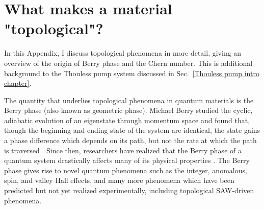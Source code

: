 \documentclass[double,12pt,1in,seploa]{beavtex}
\let\Oldsection\section
\renewcommand{\section}{\FloatBarrier\Oldsection}
\begin{document}








\chapter{What makes a material "topological"?} \label{appendix on topology}

In this Appendix, I discuss topological phenomena in more detail, giving an overview of the origin of Berry phase and the Chern number. This is additional background to the Thouless pump system discussed in Sec.\ \ref{Thouless pump intro chapter}.

The quantity that underlies topological phenomena in quantum materials is the Berry phase (also known as geometric phase). Michael Berry studied the cyclic, adiabatic evolution of an eigenstate through momentum space and found that, though the beginning and ending state of the system are identical, the state gains a phase difference which depends on its path, but not the rate at which the path is traversed \cite{berry_quantal_1984}. Since then, researchers have realized that the Berry phase of a quantum system drastically affects many of its physical properties \cite{xiao_berry_2010}. The Berry phase gives rise to novel quantum phenomena such as the integer, anomalous, spin, and valley Hall effects, and many more phenomena which have been predicted but not yet realized experimentally, including topological SAW-driven phenomena. 
\end{document}

